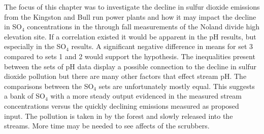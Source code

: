 The focus of this chapter was to investigate the decline in sulfur dioxide emissions from the Kingston and Bull run power plants and how it may impact the decline in SO$_4$  concentrations in the through fall measurements of the Noland divide high elevation site.
If a correlation existed it would be apparent in the pH results, but especially in the SO$_4$ results.
A significant negative difference in means for set 3 compared to sets 1 and 2 would support the hypothesis.
The inequalities present between the sets of pH data display a possible connection to the decline in sulfur dioxide pollution but there are many other factors that effect stream pH.
The comparisons between the SO$_4$ sets are unfortunately mostly equal.
This suggests a bank of SO$_4$ with a more steady output evidenced in the measured stream concentrations versus the quickly declining emissions measured as proposed input.
The pollution is taken in by the forest and slowly released into the streams.
More time may be needed to see affects of the scrubbers.

